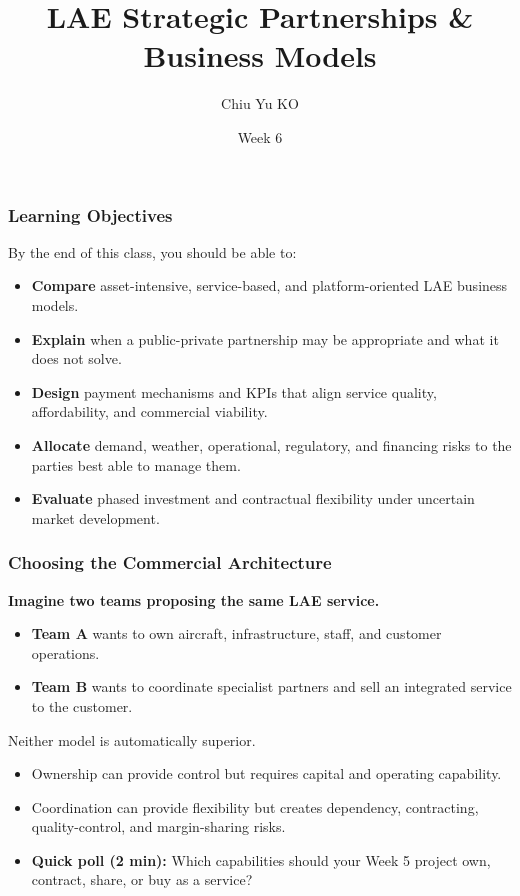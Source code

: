\documentclass{beamer}
\begin{document}
\begin{frame}
  \title{LAE Strategic Partnerships \& Business Models}
  \author{Chiu Yu KO}
  \date{Week 6}
  \titlepage
\end{frame}

\begin{frame}[t]
\frametitle{Learning Objectives}
By the end of this class, you should be able to:
\begin{itemize}
\item \textbf{Compare} asset-intensive, service-based, and platform-oriented LAE business models.
\item \textbf{Explain} when a public-private partnership may be appropriate and what it does not solve.
\item \textbf{Design} payment mechanisms and KPIs that align service quality, affordability, and commercial viability.
\item \textbf{Allocate} demand, weather, operational, regulatory, and financing risks to the parties best able to manage them.
\item \textbf{Evaluate} phased investment and contractual flexibility under uncertain market development.
\end{itemize}
\end{frame}

\begin{frame}[t]
\frametitle{Choosing the Commercial Architecture}
\textbf{Imagine two teams proposing the same LAE service.}
\begin{itemize}
\item \textbf{Team A} wants to own aircraft, infrastructure, staff, and customer operations.
\item \textbf{Team B} wants to coordinate specialist partners and sell an integrated service to the customer.
\end{itemize}
\vspace{0.3cm}
Neither model is automatically superior.
\begin{itemize}
\item Ownership can provide control but requires capital and operating capability.
\item Coordination can provide flexibility but creates dependency, contracting, quality-control, and margin-sharing risks.
\item \textbf{Quick poll (2 min):} Which capabilities should your Week 5 project own, contract, share, or buy as a service?
\end{itemize}
\end{frame}
\end{document}
